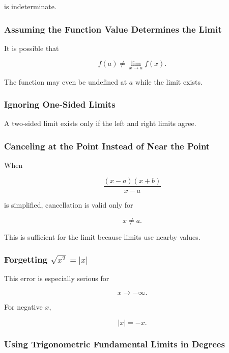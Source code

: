 is indeterminate.

\subsubsection{Assuming the Function Value Determines the Limit}

It is possible that

\[
f(a)
\neq
\lim_{x\to a}f(x).
\]

The function may even be undefined at \(a\) while the limit exists.

\subsubsection{Ignoring One-Sided Limits}

A two-sided limit exists only if the left and right limits agree.

\subsubsection{Canceling at the Point Instead of Near the Point}

When

\[
\frac{(x-a)(x+b)}{x-a}
\]

is simplified, cancellation is valid only for

\[
x\neq a.
\]

This is sufficient for the limit because limits use nearby values.

\subsubsection{Forgetting \(\sqrt{x^2}=|x|\)}

This error is especially serious for

\[
x\to-\infty.
\]

For negative \(x\),

\[
|x|=-x.
\]

\subsubsection{Using Trigonometric Fundamental Limits in Degrees}

